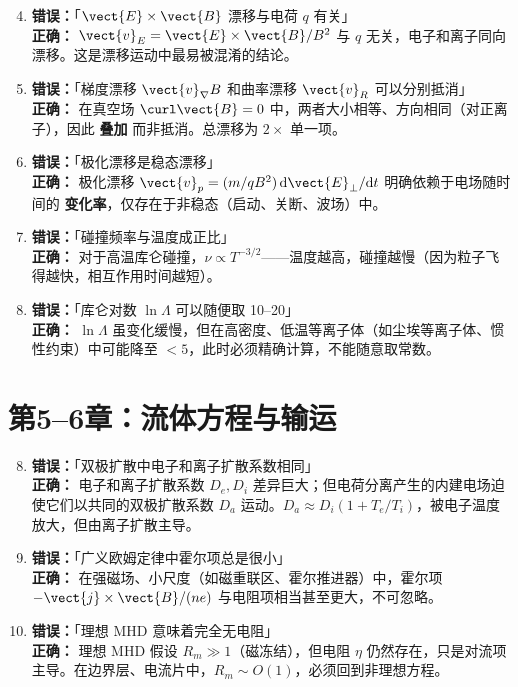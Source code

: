 \begin{warning}
\begin{enumerate}
\setcounter{enumi}{3}
\item \textbf{错误：}「$\vect{E}\times\vect{B}$ 漂移与电荷 $q$ 有关」\\
\textbf{正确：} $\vect{v}_E = \vect{E}\times\vect{B}/B^2$ 与 $q$ 无关，电子和离子同向漂移。这是漂移运动中最易被混淆的结论。

\item \textbf{错误：}「梯度漂移 $\vect{v}_\nabla B$ 和曲率漂移 $\vect{v}_R$ 可以分别抵消」\\
\textbf{正确：} 在真空场 $\curl\vect{B}=0$ 中，两者大小相等、方向相同（对正离子），因此 \textbf{叠加} 而非抵消。总漂移为 $2\times$ 单一项。

\item \textbf{错误：}「极化漂移是稳态漂移」\\
\textbf{正确：} 极化漂移 $\vect{v}_p = (m/qB^2)\,\mathrm{d}\vect{E}_\perp/\mathrm{d}t$ 明确依赖于电场随时间的 \textbf{变化率}，仅存在于非稳态（启动、关断、波场）中。

\item \textbf{错误：}「碰撞频率与温度成正比」\\
\textbf{正确：} 对于高温库仑碰撞，$\nu\propto T^{-3/2}$——温度越高，碰撞越慢（因为粒子飞得越快，相互作用时间越短）。

\item \textbf{错误：}「库仑对数 $\ln\Lambda$ 可以随便取 10--20」\\
\textbf{正确：} $\ln\Lambda$ 虽变化缓慢，但在高密度、低温等离子体（如尘埃等离子体、惯性约束）中可能降至 $<5$，此时必须精确计算，不能随意取常数。
\end{enumerate}
\end{warning}


\section{第5--6章：流体方程与输运}

\begin{warning}
\begin{enumerate}
\setcounter{enumi}{7}
\item \textbf{错误：}「双极扩散中电子和离子扩散系数相同」\\
\textbf{正确：} 电子和离子扩散系数 $D_e, D_i$ 差异巨大；但电荷分离产生的内建电场迫使它们以共同的双极扩散系数 $D_a$ 运动。$D_a\approx D_i(1+T_e/T_i)$，被电子温度放大，但由离子扩散主导。

\item \textbf{错误：}「广义欧姆定律中霍尔项总是很小」\\
\textbf{正确：} 在强磁场、小尺度（如磁重联区、霍尔推进器）中，霍尔项 $-\vect{j}\times\vect{B}/(ne)$ 与电阻项相当甚至更大，不可忽略。

\item \textbf{错误：}「理想 MHD 意味着完全无电阻」\\
\textbf{正确：} 理想 MHD 假设 $R_m\gg 1$（磁冻结），但电阻 $\eta$ 仍然存在，只是对流项主导。在边界层、电流片中，$R_m\sim O(1)$，必须回到非理想方程。
\end{enumerate}
\end{warning}


